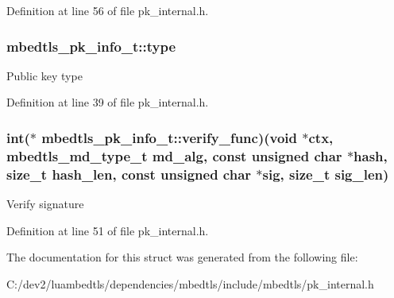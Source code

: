 Definition at line 56 of file pk\-\_\-internal.\-h.

\hypertarget{structmbedtls__pk__info__t_a1290aa516e4b5889952f56edf331c313}{
\subsubsection[{type}]{ mbedtls\-\_\-pk\-\_\-info\-\_\-t\-::type}}\label{structmbedtls__pk__info__t_a1290aa516e4b5889952f56edf331c313}
Public key type 

Definition at line 39 of file pk\-\_\-internal.\-h.

\hypertarget{structmbedtls__pk__info__t_ada03abbe988ff9c566ceec0f5f96e720}{
\subsubsection[{verify\-\_\-func}]{\setlength{\rightskip}{0pt plus 5cm}int($\ast$ mbedtls\-\_\-pk\-\_\-info\-\_\-t\-::verify\-\_\-func)(void $\ast$ctx, mbedtls\-\_\-md\-\_\-type\-\_\-t md\-\_\-alg, const unsigned char $\ast$hash, size\-\_\-t hash\-\_\-len, const unsigned char $\ast$sig, size\-\_\-t sig\-\_\-len)}}\label{structmbedtls__pk__info__t_ada03abbe988ff9c566ceec0f5f96e720}
Verify signature 

Definition at line 51 of file pk\-\_\-internal.\-h.



The documentation for this struct was generated from the following file\-:\begin{DoxyCompactItemize}
\item 
C\-:/dev2/luambedtls/dependencies/mbedtls/include/mbedtls/pk\-\_\-internal.\-h\end{DoxyCompactItemize}

